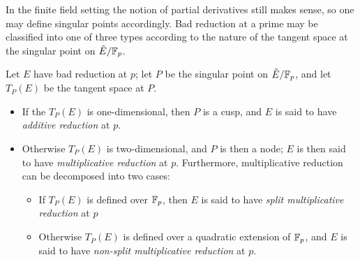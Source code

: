 \documentclass[10pt]{article}
\begin{document}
In the finite field setting the notion of partial derivatives still makes sense, so one may define singular points accordingly. Bad reduction at a prime may be classified into one of three types according to the nature of the tangent space at the singular point on $\tilde{E}/\mathbb{F}_p$.
\begin{definition}
Let $E$ have bad reduction at $p$; let $P$ be the singular point on $\tilde{E}/\mathbb{F}_p$, and let $T_P(E)$ be the tangent space at $P$.
\begin{itemize}
\item If the $T_P(E)$ is one-dimensional, then $P$ is a cusp, and $E$ is said to have {\it additive reduction} at $p$.
\item Otherwise $T_P(E)$ is two-dimensional, and $P$ is then a node; $E$ is then said to have {\it multiplicative reduction} at $p$. Furthermore, multiplicative reduction can be decomposed into two cases:
\begin{itemize}
\item If $T_P(E)$ is defined over $\mathbb{F}_p$, then $E$ is said to have {\it split multiplicative reduction} at $p$
\item Otherwise $T_P(E)$ is defined over a quadratic extension of $\mathbb{F}_p$, and $E$ is said to have {\it non-split multiplicative reduction} at $p$.
\end{itemize}
\end{itemize}
\end{definition}
\end{document}
